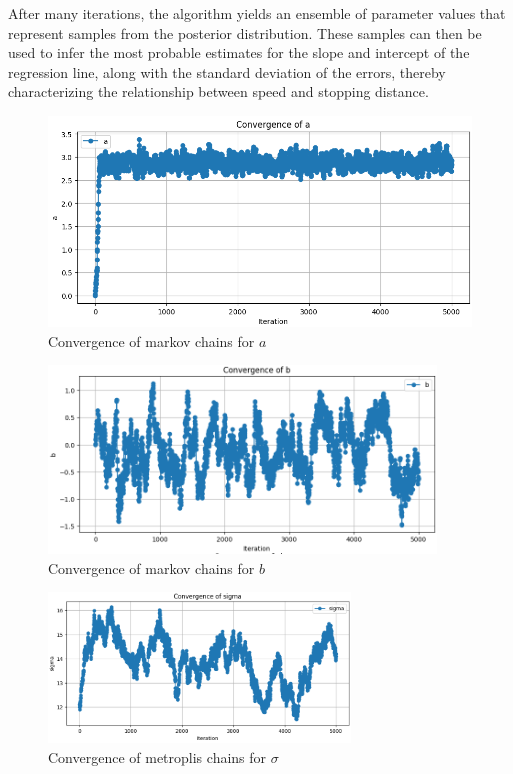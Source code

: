After many iterations, the algorithm yields an ensemble of parameter values that represent samples from the posterior distribution. These samples can then be used to infer the most probable estimates for the slope and intercept of the regression line, along with the standard deviation of the errors, thereby characterizing the relationship between speed and stopping distance.

\begin{figure}[htbp]
    \centering
    \includegraphics[width=\linewidth]{plots/output_multivar_1.png}
    \caption{Convergence of markov chains for \( a \)}
    \label{fig:my_label}
\end{figure}

\begin{figure}[htbp]
    \centering
    \includegraphics[width=\linewidth, height= 5cm]{plots/output_multivar_2.png}
    \caption{Convergence of markov chains for \( b \)}
    \label{fig:my_label}
\end{figure}

\begin{figure}[htbp]
    \centering
    \includegraphics[width=\linewidth, height= 4cm]{plots/output_multivar_3.png}
    \caption{Convergence of metroplis chains for \(\sigma\)}
    \label{fig:my_label}
\end{figure}

